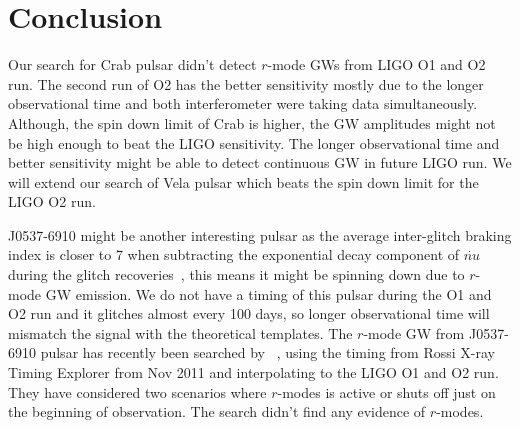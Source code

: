 \documentclass{ttuthes2007}
\begin{document}

\section{Conclusion} 

Our search for Crab pulsar didn't detect $r$-mode \acp{GW} from \ac{LIGO}
\ac{O1} and \ac{O2} run. The second run of \ac{O2} has the better sensitivity
mostly due to the longer observational time and both interferometer were taking
data simultaneously. Although, the spin down limit of Crab is higher, the \ac{GW}
amplitudes might not be high enough to beat the LIGO sensitivity. The longer
observational time and better sensitivity might be able to detect continuous
\ac{GW} in future LIGO run.  We will extend our search of Vela pulsar which
beats the spin down limit for the LIGO \ac{O2} run.  

J0537-6910 might be another interesting pulsar as the average inter-glitch
braking index is closer to 7 when subtracting the exponential decay component of
$\dot{nu}$ during the glitch recoveries~\cite{Andersson_2018,Ferdman_2018}, this
means  it might be spinning down due to $r$-mode \ac{GW} emission. We do not
have a timing of this pulsar during the \ac{O1} and \ac{O2} run and it glitches
almost every 100 days, so longer observational time will mismatch the signal
with the theoretical templates. The $r$-mode \ac{GW} from J0537-6910 pulsar has
recently been searched by ~\citet{Fesik2020}, using the timing from Rossi
X-ray Timing Explorer from Nov 2011 and interpolating to the LIGO \ac{O1} and
\ac{O2} run. They have considered two scenarios where $r$-modes is active or
shuts off just on the beginning of observation. The search didn't find any
evidence of $r$-modes.  
\end{document}
